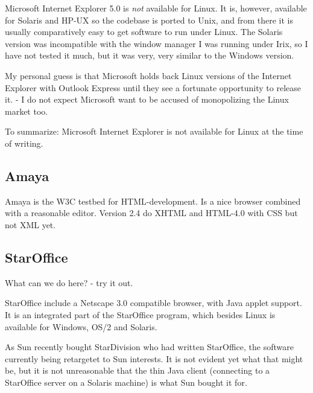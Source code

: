 Microsoft Internet Explorer 5.0 is \textit{not} available for Linux.
It is, however, available for Solaris and HP-UX so the codebase is
ported to Unix, and from there it is usually comparatively easy to get
software to run under Linux.  The Solaris version was incompatible
with the window manager I was running under Irix, so I have not tested
it much, but it was very, very similar to the Windows version.

My personal guess is that Microsoft holds back Linux versions of the
Internet Explorer with Outlook Express until they see a fortunate
opportunity to release it.   - I do not expect Microsoft want to
be accused of monopolizing the Linux market too.

To summarize:  Microsoft Internet Explorer is not available for Linux
at the time of writing.

\subsection{Amaya}
\label{sec:amaya}

Amaya is the W3C testbed for HTML-development.  Is a nice browser
combined with a reasonable editor.  Version 2.4 do XHTML and HTML-4.0
with CSS but not XML yet.




\subsection{StarOffice}
\label{sec:staroffice}

\textsf{What can we do here?} - try  it out.

StarOffice include a Netscape \textsf{3.0} compatible browser, with
Java applet support.  It is an integrated part of the StarOffice
program, which besides Linux is available for Windows, OS/2 and
Solaris.

As Sun recently bought StarDivision who had written StarOffice, the
software currently being retargetet to Sun interests.  It is not
evident yet what that might be, but it is not unreasonable that the
thin Java client (connecting to a StarOffice server on a Solaris
machine) is what Sun bought it for.

